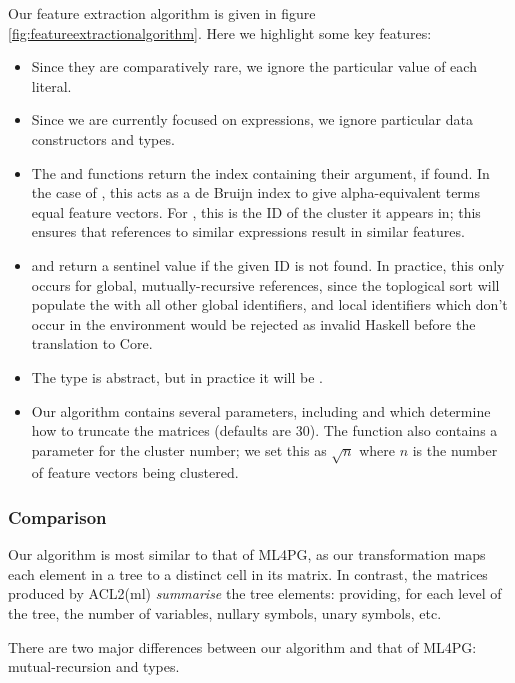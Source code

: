 Our feature extraction algorithm is given in figure \ref{fig:featureextractionalgorithm}. Here we highlight some key features:

\begin{itemize}
  \item Since they are comparatively rare, we ignore the particular value of each literal.
  \item Since we are currently focused on expressions, we ignore particular data constructors and types.
  \item The  and  functions return the index containing their argument, if found. In the case of , this acts as a de Bruijn index to give alpha-equivalent terms equal feature vectors. For , this is the ID of the cluster it appears in; this ensures that references to similar expressions result in similar features.
  \item {} and  return a sentinel value  if the given ID is not found. In practice, this only occurs for global, mutually-recursive references, since the toplogical sort will populate the  with all other global identifiers, and local identifiers which don't occur in the environment would be rejected as invalid Haskell before the translation to Core.
  \item The  type is abstract, but in practice it will be .
  \item Our algorithm contains several parameters, including  and  which determine how to truncate the matrices (defaults are 30). The  function also contains a parameter for the cluster number; we set this as $\sqrt{n}$ where $n$ is the number of feature vectors being clustered.
\end{itemize}

\subsubsection{Comparison}

Our algorithm is most similar to that of ML4PG, as our transformation maps each element in a tree to a distinct cell in its matrix. In contrast, the matrices produced by ACL2(ml) \emph{summarise} the tree elements: providing, for each level of the tree, the number of variables, nullary symbols, unary symbols, etc.

There are two major differences between our algorithm and that of ML4PG: mutual-recursion and types.

